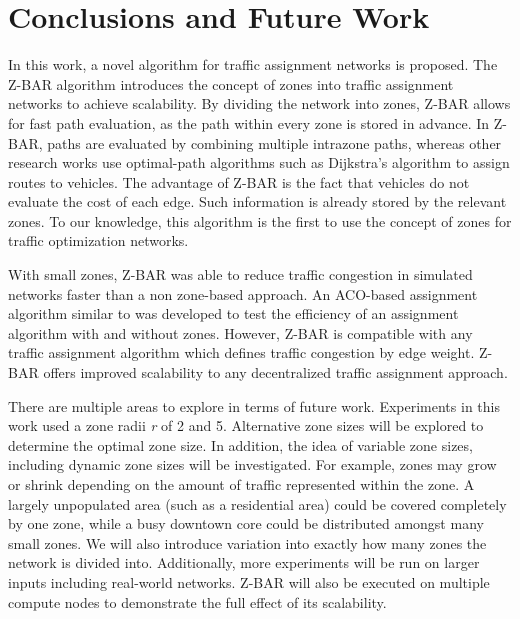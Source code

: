 \documentclass[conference]{IEEEtran}
\begin{document}
\section{Conclusions and Future Work} %

In this work, a novel algorithm for traffic assignment networks is proposed. The Z-BAR algorithm introduces the concept of zones into traffic assignment networks to achieve scalability. By dividing the network into zones, Z-BAR allows for fast path evaluation, as the path within every zone is stored in advance. In Z-BAR, paths are evaluated by combining multiple intrazone paths, whereas other research works use optimal-path algorithms such as Dijkstra's algorithm to assign routes to vehicles. The advantage of Z-BAR is the fact that vehicles do not evaluate the cost of each edge. Such information is already stored by the relevant zones. To our knowledge, this algorithm is the first to use the concept of zones for traffic optimization networks. 

With small zones, Z-BAR was able to reduce traffic congestion in simulated networks faster than a non zone-based approach. An ACO-based assignment algorithm similar to \cite{iaco} was developed to test the efficiency of an assignment algorithm with and without zones. However, Z-BAR is compatible with any traffic assignment algorithm which defines traffic congestion by edge weight. Z-BAR offers improved scalability to any decentralized traffic assignment approach.

There are multiple areas to explore in terms of future work. Experiments in this work used a zone radii \textit{r} of 2 and 5. Alternative zone sizes will be explored to determine the optimal zone size. In addition, the idea of variable zone sizes, including dynamic zone sizes will be investigated. For example, zones may grow or shrink depending on the amount of traffic represented within the zone. A largely unpopulated area (such as a residential area) could be covered completely by one zone, while a busy downtown core could be distributed amongst many small zones. We will also introduce variation into exactly how many zones the network is divided into. Additionally, more experiments will be run on larger inputs including real-world networks. Z-BAR will also be executed on multiple compute nodes to demonstrate the full effect of its scalability.
\end{document}
